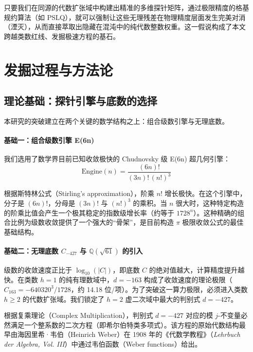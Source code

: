 \documentclass[11pt,a4paper]{ctexart}
\begin{document}
只要我们在同源的代数扩张域中构建出精准的多维探针矩阵，通过极限精度的格基规约算法（如 PSLQ），就可以强制让这些无理残差在物理精度层面发生完美对消（湮灭），从而直接萃取出隐藏在混沌中的纯代数整数权重。这一假说构成了本文跨越类数红线、发掘极速方程的基石。

\section{发掘过程与方法论}

\subsection{理论基础：探针引擎与底数的选择}

本研究的突破建立在两个关键的数学结构之上：组合级数引擎与无理底数。

\paragraph{基础一：组合级数引擎 E(6n)}
我们选用了数学界目前已知收敛极快的 Chudnovsky 级 E(6n) 超几何引擎：
\begin{equation}
\text{Engine}(n) = \frac{(6n)!}{(3n)!\,(n!)^3}
\end{equation}

根据斯特林公式（Stirling's approximation），阶乘 $n!$ 增长极快。在这个引擎中，分子是 $(6n)!$，分母是 $(3n)!$ 与 $(n!)^3$ 的乘积。当 $n$ 很大时，这种特定构造的阶乘比值会产生一个极其稳定的指数级增长率（约等于 $1728^n$）。这种精确的组合比例为级数收敛提供了一个强大的“骨架”，是目前构造 $\pi$ 极限收敛公式的最佳基础结构。

\paragraph{基础二：无理底数 $C_{-427}$ 与 $\mathbb{Q}(\sqrt{61})$ 的引入}
级数的收敛速度正比于 $\log_{10}(|C|)$，即底数 $C$ 的绝对值越大，计算精度提升越快。在类数 $h=1$ 的纯有理数域中，$d=-163$ 构成了收敛速度的理论极限（$C_{163} = -640320^3 / 1728$，约 14.18 位/项）。为了突破这一算力极限，必须进入类数 $h \ge 2$ 的代数扩张域。我们锁定了 $h=2$ 虚二次域中最大的判别式 $d=-427$。

根据复乘理论（Complex Multiplication），判别式 $d=-427$ 对应的模 $j$-不变量必然满足一个整系数的二次方程（即希尔伯特类多项式）。该方程的原始代数结构最早由海因里希·韦伯（Heinrich Weber）在 1908 年的《代数学教程》（\textit{Lehrbuch der Algebra, Vol. III}）中通过韦伯函数（Weber functions）给出。
\end{document}
